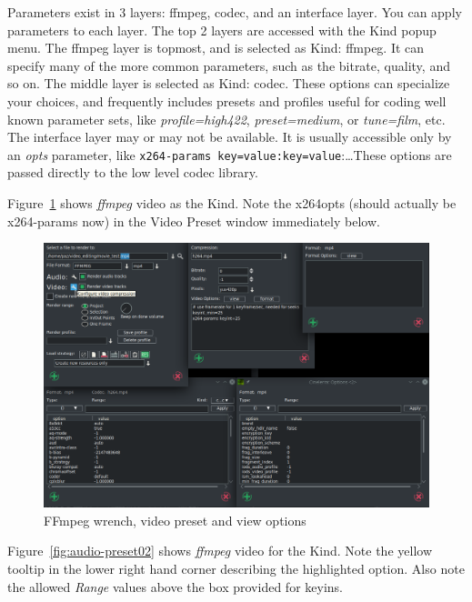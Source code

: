 Parameters exist in 3 layers: ffmpeg, codec, and an interface layer.  You can apply parameters to each layer.  The top 2 layers are accessed with the Kind popup menu. The ffmpeg layer is topmost, and is selected as Kind: ffmpeg.  It can specify many of the more common parameters, such as the bitrate, quality, and so on.  The middle layer is selected as Kind: codec.  These options can specialize your choices, and frequently includes presets and profiles useful for coding well known parameter sets, like \textit{profile=high422}, \textit{preset=medium}, or \textit{tune=film}, etc.   The interface layer may or may not be available.  It is usually accessible only by an \textit{opts} parameter, like \texttt{x264-params key=value:key=value}:\dots  These options are passed directly to the low level codec library.

Figure~\ref{fig:video-preset} shows \textit{ffmpeg} video as the Kind. Note the x264opts (should actually be x264-params now) in the Video Preset window immediately below.

\begin{figure}[htpb]
    \centering
    \includegraphics[width=0.8\linewidth]{images/video-preset.png}
    \caption{FFmpeg wrench, video preset and view options}
    \label{fig:video-preset}
\end{figure}

Figure~\ref{fig:audio-preset02} shows \textit{ffmpeg} video for the Kind. Note the yellow tooltip in the lower right hand corner describing the highlighted option.  Also note the allowed \textit{Range} values above the box provided for keyins.

